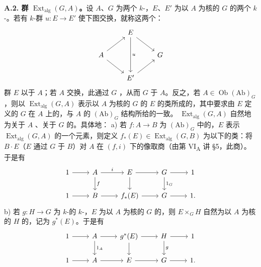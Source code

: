 \textbf{A.2. 群 $\operatorname{Ext}_{\mathrm{alg}}(G,A)$。}设 $A$、$G$ 为两个 $k$-，$E$、$E'$ 为以 $A$ 为核的 $G$ 的两个 $k$-。若有 $k$-群 $u:E\to E'$ 使下图交换，就称这两个：
\[
\begin{tikzcd}
 & E\arrow[dr]\arrow[dd,"u"] & \\
 A\arrow[ur]\arrow[dr] & &G\\
 &E'\arrow[ur]&
\end{tikzcd}
\]
群 $E$ 以于 $A$；若 $A$ 交换，此通过 $G$ ，从而 $G$ 于 $A$。反之，若 $A\in\operatorname{Ob}(\mathrm{Ab})_G$，则以 $\operatorname{Ext}_{\mathrm{alg}}(G,A)$ 表示以 $A$ 为核的 $G$ 的 $E$ 的类所成的，其中要求由 $E$ 定义的 $G$ 在 $A$ 上的，与 $A$ 的 $(\mathrm{Ab})_G$ 结构所给的一致。
$\operatorname{Ext}_{\mathrm{alg}}(G,A)$ 自然地为关于 $A$ 、关于 $G$ 的。具体地：
a) 若 $f:A\to B$ 为 $(\mathrm{Ab})_G$ 中的，$E$ 表示 $\operatorname{Ext}_{\mathrm{alg}}(G,A)$ 的一个元素，则定义 $f_*(E)\in\operatorname{Ext}_{\mathrm{alg}}(G,B)$ 为以下的类：将 $B\cdot E$（$E$ 通过 $G$ 于 $B$）对 $A$ 在 $(f,i)$ 下的像取商（由第 VI\textsubscript{A} 讲 §5，此商）。于是有
\[
\begin{tikzcd}
1\arrow[r]&A\arrow[r,"i"]\arrow[d,"f"]&E\arrow[r]\arrow[d]&G\arrow[r]\arrow[d,"1_G"]&1\\
1\arrow[r]&B\arrow[r]&f_*(E)\arrow[r]&G\arrow[r]&1.
\end{tikzcd}
\]
b) 若 $g:H\to G$ 为 $k$-的 $k$-，$E$ 为以 $A$ 为核的 $G$ 的，则 $E\times_GH$ 自然为以 $A$ 为核的 $H$ 的，记为 $g^*(E)$。于是有
\[
\begin{tikzcd}
1\arrow[r]&A\arrow[r]\arrow[d,"1_A"]&g^*(E)\arrow[r]\arrow[d]&H\arrow[r]\arrow[d,"g"]&1\\
1\arrow[r]&A\arrow[r]&E\arrow[r]&G\arrow[r]&1.
\end{tikzcd}
\]
